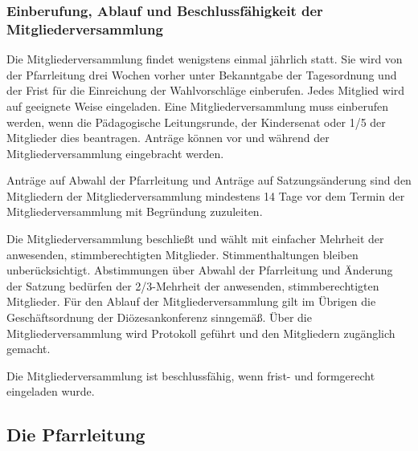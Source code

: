 \documentclass[12pt]{report}
\begin{document}
\begin{flushleft}
\subsubsection{Einberufung, Ablauf und Beschlussfähigkeit der Mitgliederversammlung}
Die Mitgliederversammlung findet wenigstens einmal jährlich statt. Sie wird von der Pfarrleitung
drei Wochen vorher unter Bekanntgabe der Tagesordnung und der Frist für die Einreichung
der Wahlvorschläge einberufen. Jedes Mitglied wird auf geeignete Weise eingeladen.
Eine Mitgliederversammlung muss einberufen werden, wenn die Pädagogische Leitungsrunde,
der Kindersenat oder 1/5 der Mitglieder dies beantragen. Anträge können vor und während der 
Mitgliederversammlung eingebracht werden.

Anträge auf Abwahl der Pfarrleitung und Anträge auf Satzungsänderung sind den Mitgliedern
der Mitgliederversammlung mindestens 14 Tage vor dem Termin der Mitgliederversammlung mit
Begründung zuzuleiten.

Die Mitgliederversammlung beschließt und wählt mit einfacher Mehrheit der anwesenden, stimmberechtigten Mitglieder.
Stimmenthaltungen bleiben unberücksichtigt. Abstimmungen über
Abwahl der Pfarrleitung und Änderung der Satzung bedürfen der 2/3-Mehrheit der anwesenden,
stimmberechtigten Mitglieder. Für den Ablauf der Mitgliederversammlung gilt im
Übrigen die Geschäftsordnung der Diözesankonferenz sinngemäß. Über die Mitgliederversammlung
wird Protokoll geführt und den Mitgliedern zugänglich gemacht.

Die Mitgliederversammlung ist beschlussfähig, wenn frist- und formgerecht eingeladen wurde.
\subsection{Die Pfarrleitung}

\end{flushleft}
\end{document}
